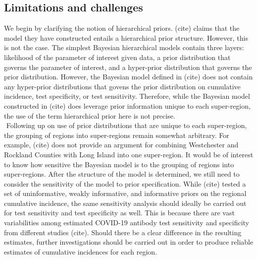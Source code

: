 \subsection{Limitations and challenges}
We begin by clarifying the notion of hierarchical priors. (cite) claims that the model they have constructed entails a hierarchical prior structure. However, this is not the case. The simplest Bayesian hierarchical models contain three layers: likelihood of the parameter of interest given data, a prior distribution that governs the parameter of interest, and a hyper-prior distribution that governs the prior distribution. However, the Bayesian model defined in (cite) does not contain any hyper-prior distributions that govens the prior distribution on cumulative incidence, test specificity, or test sensitivity. Therefore, while the Bayesian model constructed in (cite) does leverage prior information unique to each super-region, the use of the term hierarchical prior here is not precise.\\
\newline$ $
Following up on use of prior distributions that are unique to each super-region, the grouping of regions into super-regions remain somewhat arbitrary. For example, (cite) does not provide an argument for combining Westchester and Rockland Counties with Long Island into one super-region. It would be of interest to know how sensitive the Bayesian model is to the grouping of regions into super-regions. After the structure of the model is determined, we still need to consider the sensitivity of the model to prior specification. While (cite) tested a set of uninformative, weakly informative, and informative priors on the regional cumulative incidence, the same sensitivity analysis should ideally be carried out for test sensitivity and test specificity as well. This is because there are vast variabilities among estimated COVID-19 antibody test sensitivity and specificity from different studies (cite). Should there be a clear difference in the resulting estimates, further investigations should be carried out in order to produce reliable estimates of cumulative incidences for each region.\\
\newline$ $
